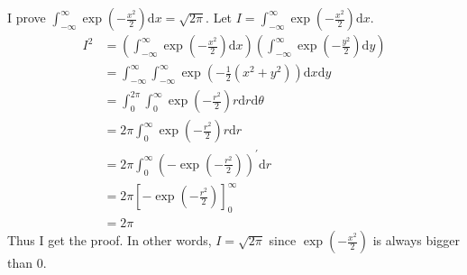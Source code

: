 \documentclass{article}
\begin{document}
	\subsection{}
	 	I prove $\int_{-\infty}^{\infty} \exp\left( -\frac{x^2}{2} \right) \mathrm{d}x = \sqrt{2\pi}$. Let $I = \int_{-\infty}^{\infty} \exp\left( -\frac{x^2}{2} \right) \mathrm{d}x$.
		\begin{align*}
			I^2 &= \left( \int_{-\infty}^{\infty} \exp\left( -\frac{x^2}{2} \right) \mathrm{d}x \right) \left( \int_{-\infty}^{\infty} \exp\left( -\frac{y^2}{2} \right) \mathrm{d}y \right)\\
			&= \int_{-\infty}^{\infty} \int_{-\infty}^{\infty} \exp \left( -\frac{1}{2} (x^2 + y^2)\right) \mathrm{d}x \mathrm{d}y\\
			&= \int_{0}^{2\pi} \int_{0}^{\infty} \exp \left( -\frac{r^2}{2} \right) r \mathrm{d}r \mathrm{d}\theta\\
			&= 2\pi \int_{0}^{\infty} \exp \left( -\frac{r^2}{2} \right) r \mathrm{d}r\\
			&= 2\pi \int_{0}^{\infty} \left( -\exp \left( -\frac{r^2}{2} \right)\right)^{'} \mathrm{d}r\\
			&= 2\pi [-\exp \left( -\frac{r^2}{2} \right)]_{0}^{\infty}\\
			&= 2\pi
		\end{align*}
		Thus I get the proof. In other words, $I = \sqrt{2\pi}$ since $\exp\left( -\frac{x^2}{2} \right)$ is always bigger than 0.
\end{document}
